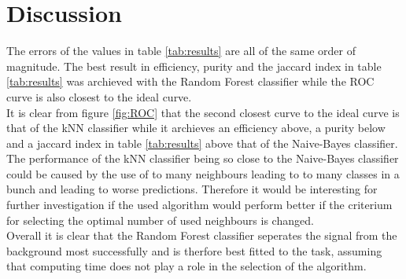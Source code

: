 \section{Discussion}\label{sec:Durchführung}
The errors of the values in table \ref{tab:results} are all of the same order of magnitude.
The best result in efficiency, purity and the jaccard index in table \ref{tab:results} was archieved with the Random Forest classifier while the ROC curve 
is also closest to the ideal curve. \\
It is clear from figure \ref{fig:ROC} that the second closest curve to the ideal curve is that of the kNN classifier while 
it archieves an efficiency above, a purity below and a jaccard index in table \ref{tab:results} above that of the Naive-Bayes classifier. 
The performance of the kNN classifier being so close to the Naive-Bayes classifier could be caused by the use of 
to many neighbours leading to to many classes in a bunch and leading to worse predictions. 
Therefore it would be interesting for further investigation if the used algorithm would perform better 
if the criterium for selecting the optimal number of used neighbours is changed. \\
Overall it is clear that the Random Forest classifier seperates the signal from the background most successfully 
and is therfore best fitted to the task, assuming that computing time does not play a role in the selection of the algorithm.